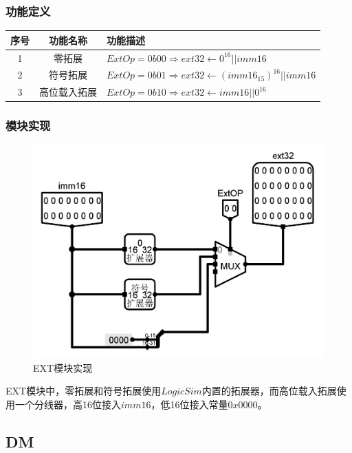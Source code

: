 \documentclass[main.tex]{subfiles}
\begin{document}
\subsubsection{功能定义}
\begin{center}
    \begin{tabular}{c c l}
        \toprule
        序号 & 功能名称 & 功能描述 \\
        \midrule
        1 & 零拓展 & $ExtOp = 0b00 \Rightarrow ext32 \leftarrow 0^{16} || imm16$ \\
        2 & 符号拓展 & $ExtOp = 0b01 \Rightarrow ext32 \leftarrow \left(imm16_{15}\right)^{16} || imm16$ \\
        3 & 高位载入拓展 & $ExtOp = 0b10 \Rightarrow ext32 \leftarrow imm16 || 0^{16}$\\
        \bottomrule
    \end{tabular}
\end{center}

\subsubsection{模块实现}
\begin{figure}[h]
\centering
\includegraphics[width=\textwidth]{images/EXT-circuit.png}
\caption{EXT模块实现}
\end{figure}
EXT模块中，零拓展和符号拓展使用$LogicSim$内置的拓展器，而高位载入拓展使用一个分线器，高16位接入$imm16$，低16位接入常量$0x0000$。


\clearpage
\subsection{DM}
\end{document}

